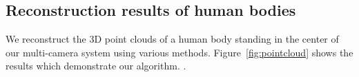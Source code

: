 \subsection{Reconstruction results of human bodies}

We reconstruct the 3D point clouds of a human body standing in the center of our multi-camera system using various methods. Figure~\ref{fig:pointcloud} shows the results which demonstrate our algorithm.
.


\begin{figure}[ht]
  \centering
{}%
\end{figure}
